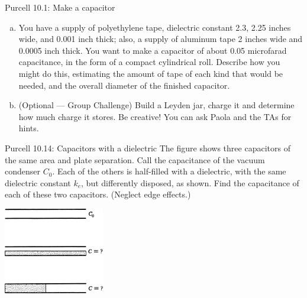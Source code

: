 \documentclass{esg8022pset}
\begin{document}
\begin{problem}{Purcell 10.1: Make a capacitor}
  \begin{enumerate}[(a)]
    \item You have a supply of polyethylene tape, dielectric constant 
      2.3, 2.25 inches wide, and 0.001 inch thick; also, a supply of aluminum 
      tape 2 inches wide and 0.0005 inch thick. You want to make a capacitor
      of about 0.05 microfarad capacitance, in the form of a compact 
      cylindrical roll. Describe how you might do this, estimating the 
      amount of tape of each kind that would be needed, and the overall 
      diameter of the finished capacitor. 
    \item (Optional --- Group Challenge) Build a Leyden jar, charge it
      and determine how much charge it stores. Be creative!  You can ask
      Paola and the TAs for hints.
  \end{enumerate}
\end{problem}
\begin{solution}

\end{solution}






\begin{problem}{Purcell 10.14: Capacitors with a dielectric}
  The figure shows three capacitors of the same area and plate 
  separation. Call the capacitance of the vacuum condenser $C_0$. Each of 
  the others is half-filled with a dielectric, with the same dielectric constant
  $k_e$, but differently disposed, as shown. Find the capacitance of 
  each of these two capacitors. (Neglect edge effects.)
  \begin{center}\includegraphics[width=0.33\textwidth]{ps04_08}\end{center}
\end{problem}
\begin{solution}

\end{solution}
\end{document}
